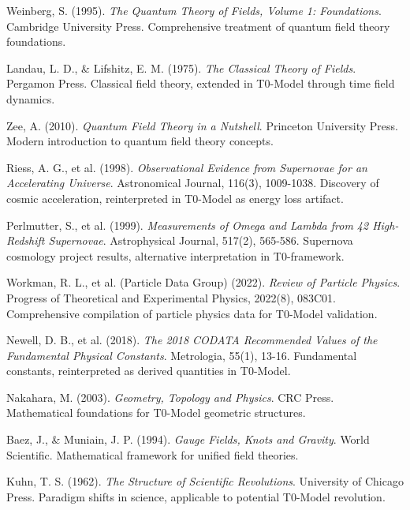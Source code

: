 \documentclass[12pt,a4paper]{report}
\begin{document}
\begin{thebibliography}{50}
		Weinberg, S. (1995). \textit{The Quantum Theory of Fields, Volume 1: Foundations}. Cambridge University Press. Comprehensive treatment of quantum field theory foundations.
		
		Landau, L. D., \& Lifshitz, E. M. (1975). \textit{The Classical Theory of Fields}. Pergamon Press. Classical field theory, extended in T0-Model through time field dynamics.
		
		Zee, A. (2010). \textit{Quantum Field Theory in a Nutshell}. Princeton University Press. Modern introduction to quantum field theory concepts.
		
		Riess, A. G., et al. (1998). \textit{Observational Evidence from Supernovae for an Accelerating Universe}. Astronomical Journal, 116(3), 1009-1038. Discovery of cosmic acceleration, reinterpreted in T0-Model as energy loss artifact.
		
		Perlmutter, S., et al. (1999). \textit{Measurements of Omega and Lambda from 42 High-Redshift Supernovae}. Astrophysical Journal, 517(2), 565-586. Supernova cosmology project results, alternative interpretation in T0-framework.
		
		Workman, R. L., et al. (Particle Data Group) (2022). \textit{Review of Particle Physics}. Progress of Theoretical and Experimental Physics, 2022(8), 083C01. Comprehensive compilation of particle physics data for T0-Model validation.
		
		Newell, D. B., et al. (2018). \textit{The 2018 CODATA Recommended Values of the Fundamental Physical Constants}. Metrologia, 55(1), 13-16. Fundamental constants, reinterpreted as derived quantities in T0-Model.
		
		Nakahara, M. (2003). \textit{Geometry, Topology and Physics}. CRC Press. Mathematical foundations for T0-Model geometric structures.
		
		Baez, J., \& Muniain, J. P. (1994). \textit{Gauge Fields, Knots and Gravity}. World Scientific. Mathematical framework for unified field theories.
		
		Kuhn, T. S. (1962). \textit{The Structure of Scientific Revolutions}. University of Chicago Press. Paradigm shifts in science, applicable to potential T0-Model revolution.
		

\end{thebibliography}
\end{document}
